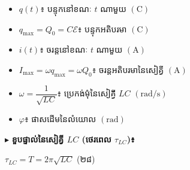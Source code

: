 \vspace{0.3em}
\noindent
\begin{minipage}[t]{0.47\textwidth}
	\vspace{0pt}
	\raggedright
	\begin{itemize}[itemsep=3pt, topsep=1pt, parsep=0pt, leftmargin=1.4em]
		\item $q(t)$៖ បន្ទុកនៅខណៈ $t$ ណាមួយ $(\mathrm{C})$
		\item $q_{\max} = Q_0 = C\mathcal{E}$៖ បន្ទុកអតិបរមា $(\mathrm{C})$
		\item $i(t)$៖ ចរន្តនៅខណៈ $t$ ណាមួយ $(\mathrm{A})$
		\item $I_{\max} = \omega q_{\max} = \omega Q_0$៖ ចរន្តអតិបរមានៃសៀគ្វី $(\mathrm{A})$
		\item $\omega = \dfrac{1}{\sqrt{LC}}$៖ ប្រេកង់មុំនៃសៀគ្វី $LC$ $(\mathrm{rad/s})$
		\item $\varphi$៖ ផាសដើមនៃលំយោល $(\mathrm{rad})$
	\end{itemize}

	\vspace{0.4em}
	\noindent
	$\blacktriangleright$ \textbf{\textcolor{khmerred}{ខួបផ្ទាល់នៃសៀគ្វី $LC$ (ថេរពេល $\tau_{LC}$)៖}}
	\begin{center}
		$\boxed{\tau_{LC} = T = 2\pi\sqrt{LC}}$ \quad (២៨)
	\end{center}
\end{minipage}%
\hfill
